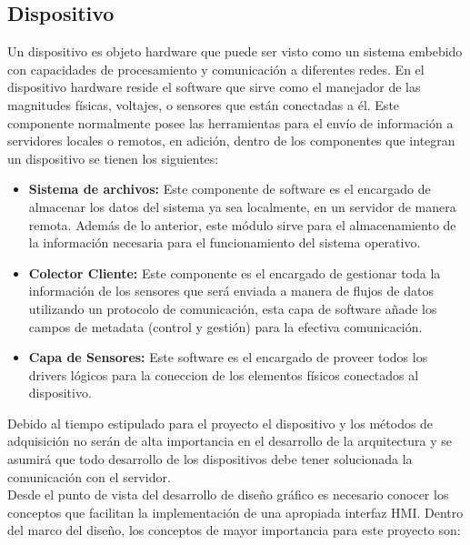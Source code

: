 \subsection{Dispositivo}
Un dispositivo es objeto hardware que puede ser visto como un sistema embebido con capacidades de procesamiento y comunicación a diferentes redes. En el dispositivo hardware reside el software que sirve como el manejador de las magnitudes físicas, voltajes, o sensores que están conectadas a él. Este componente normalmente posee las herramientas para el envío de información a servidores locales o remotos, en adición, dentro de los componentes que integran un dispositivo se tienen los siguientes:

\begin{itemize}
	\item \textbf{Sistema de archivos:} Este componente de software es el encargado de almacenar los datos del sistema ya sea localmente, en un servidor de manera remota. Además de lo anterior, este módulo sirve para el almacenamiento de la información necesaria para el funcionamiento del sistema operativo. 
    
	\item \textbf{Colector Cliente:} Este componente es el encargado de gestionar toda la información de los sensores que será enviada a manera de flujos de datos utilizando un protocolo de comunicación, esta capa de software añade los campos de metadata (control y gestión) para la efectiva comunicación.
	\item \textbf{Capa de Sensores:} Este software es el encargado de proveer todos los drivers lógicos para la coneccion de los elementos físicos conectados al dispositivo.
\end{itemize}

Debido al tiempo estipulado para el proyecto el dispositivo y los métodos de adquisición no serán de alta importancia en el desarrollo de la arquitectura y se asumirá que todo desarrollo de los dispositivos debe tener solucionada la comunicación con el servidor.
\vspace{0.5cm}\\
Desde el punto de vista del desarrollo de diseño gráfico es necesario conocer los conceptos que facilitan la implementación de una apropiada interfaz HMI. Dentro del marco del diseño, los conceptos de mayor importancia para este proyecto son:




